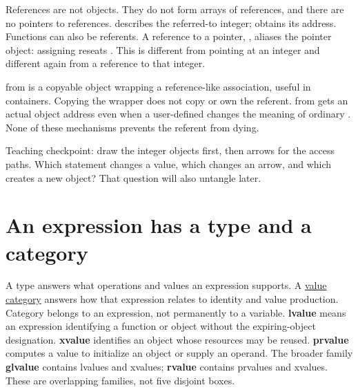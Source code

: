 References are not objects. They do not form arrays of references, and there are no pointers to references.  describes the referred-to integer;  obtains its address. Functions can also be referents. A reference to a pointer, , aliases the pointer object: assigning  reseats . This is different from  pointing at an integer and different again from a reference to that integer.

 from  is a copyable object wrapping a reference-like association, useful in containers. Copying the wrapper does not copy or own the referent.  from  gets an actual object address even when a user-defined  changes the meaning of ordinary . None of these mechanisms prevents the referent from dying.

Teaching checkpoint: draw the integer objects first, then arrows for the access paths. Which statement changes a value, which changes an arrow, and which creates a new object? That question will also untangle  later.

\section{An expression has a type and a category}\label{01-foundations-i-ch003-an-expression-has-a-type-and-a-category}

\hypertarget{01-foundations-i-ch003-an-expression-has-a-type-and-a-category}{}

A type answers what operations and values an expression supports. A \hyperref[appendix-1121b30eaeb0]{value category} answers how that expression relates to identity and value production. Category belongs to an expression, not permanently to a variable. \textbf{lvalue} means an expression identifying a function or object without the expiring-object designation. \textbf{xvalue} identifies an object whose resources may be reused. \textbf{prvalue} computes a value to initialize an object or supply an operand. The broader family \textbf{glvalue} contains lvalues and xvalues; \textbf{rvalue} contains prvalues and xvalues. These are overlapping families, not five disjoint boxes.

